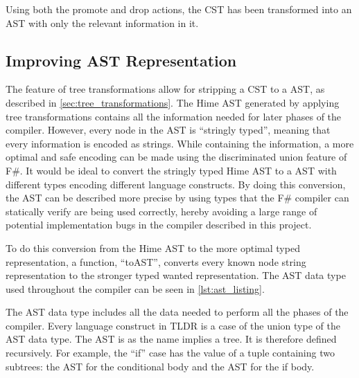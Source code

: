 Using both the promote and drop actions, the CST has been transformed into an AST with only the relevant information in it.

\subsection{Improving AST Representation}

The feature of tree transformations allow for stripping a CST to a AST, as described in \cref{sec:tree_transformations}. The Hime AST generated by applying tree transformations contains all the information needed for later phases of the compiler. However, every node in the AST is \enquote{stringly typed}, meaning that every information is encoded as strings. While containing the information, a more optimal and safe encoding can be made using the discriminated union feature of F\#. It would be ideal to convert the stringly typed Hime AST to a AST with different types encoding different language constructs. By doing this conversion, the AST can be described more precise by using types that the F\# compiler can statically verify are being used correctly, hereby avoiding a large range of potential implementation bugs in the compiler described in this project.

To do this conversion from the Hime AST to the more optimal typed representation, a function, \enquote{toAST}, converts every known node string representation to the stronger typed wanted representation. The AST data type used throughout the compiler can be seen in \cref{lst:ast_listing}. 

The AST data type includes all the data needed to perform all the phases of the compiler. Every language construct in TLDR is a case of the union type of the AST data type. The AST is as the name implies a tree. It is therefore defined recursively. For example, the \enquote{if} case has the value of a tuple containing two subtrees: the AST for the conditional body and the AST for the if body.

